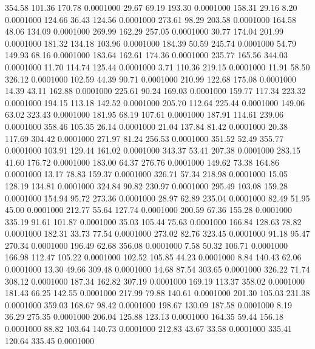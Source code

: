  354.58  101.36  170.78   0.0001000
  29.67   69.19  193.30   0.0001000
 158.31   29.16    8.20   0.0001000
 124.66   36.43  124.56   0.0001000
 273.61   98.29  203.58   0.0001000
 164.58   48.06  134.09   0.0001000
 269.99  162.29  257.05   0.0001000
  30.77  174.04  201.99   0.0001000
 181.32  134.18  103.96   0.0001000
 184.39   50.59  245.74   0.0001000
  54.79  149.93   68.16   0.0001000
 183.64  162.61  174.36   0.0001000
 235.77  165.56  344.03   0.0001000
  11.70  114.74  125.44   0.0001000
   3.71  110.36  219.15   0.0001000
  11.91   58.50  326.12   0.0001000
 102.59   44.39   90.71   0.0001000
 210.99  122.68  175.08   0.0001000
  14.39   43.11  162.88   0.0001000
 225.61   90.24  169.03   0.0001000
 159.77  117.34  223.32   0.0001000
 194.15  113.18  142.52   0.0001000
 205.70  112.64  225.44   0.0001000
 149.06   63.02  323.43   0.0001000
 181.95   68.19  107.61   0.0001000
 187.91  114.61  239.06   0.0001000
 358.46  105.35   26.14   0.0001000
  21.04  137.84   81.42   0.0001000
  20.38  117.69  304.42   0.0001000
 271.97   81.24  256.53   0.0001000
 351.52   52.49  355.77   0.0001000
 103.91  129.44  161.02   0.0001000
 343.37   53.41  207.38   0.0001000
 283.15   41.60  176.72   0.0001000
 183.00   64.37  276.76   0.0001000
 149.62   73.38  164.86   0.0001000
  13.17   78.83  159.37   0.0001000
 326.71   57.34  218.98   0.0001000
  15.05  128.19  134.81   0.0001000
 324.84   90.82  230.97   0.0001000
 295.49  103.08  159.28   0.0001000
 154.94   95.72  273.36   0.0001000
  28.97   62.89  235.04   0.0001000
  82.49   51.95   45.00   0.0001000
 212.77   55.64  127.74   0.0001000
 200.59   67.36  155.28   0.0001000
 335.19   91.61  101.87   0.0001000
  35.03  105.44   75.63   0.0001000
 166.84  128.63   78.82   0.0001000
 182.31   33.73   77.54   0.0001000
 273.02   82.76  323.45   0.0001000
  91.18   95.47  270.34   0.0001000
 196.49   62.68  356.08   0.0001000
   7.58   50.32  106.71   0.0001000
 166.98  112.47  105.22   0.0001000
 102.52  105.85   44.23   0.0001000
   8.84  140.43   62.06   0.0001000
  13.30   49.66  309.48   0.0001000
  14.68   87.54  303.65   0.0001000
 326.22   71.74  308.12   0.0001000
 187.34  162.82  307.19   0.0001000
 169.19  113.37  358.02   0.0001000
 181.43   66.25  142.55   0.0001000
 217.99   79.88  140.61   0.0001000
 201.30  105.03  231.38   0.0001000
 359.03  168.67   98.42   0.0001000
 198.67  130.09  187.58   0.0001000
   8.19   36.29  275.35   0.0001000
 206.04  125.88  123.13   0.0001000
 164.35   59.44  156.18   0.0001000
  88.82  103.64  140.73   0.0001000
 212.83   43.67   33.58   0.0001000
 335.41  120.64  335.45   0.0001000
